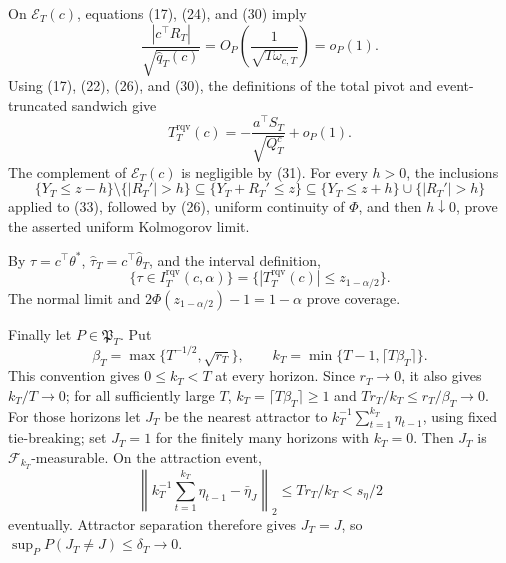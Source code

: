 On \(\mathcal E_T(c)\), equations (17), (24), and (30) imply
\[
 \frac{|c^\top R_T|}{\sqrt{\widehat q_T(c)}}
 =O_P\!\left(\frac1{\sqrt{T\omega_{c,T}}}\right)=o_P(1).
\tag{32}
\]
Using (17), (22), (26), and (30), the definitions of the total pivot and event-truncated sandwich give
\[
 T_T^{\mathrm{rqv}}(c)
 =-\frac{a^\top S_T}{\sqrt{Q_T^c}}+o_P(1).
\tag{33}
\]
The complement of \(\mathcal E_T(c)\) is negligible by (31). For every \(h>0\), the inclusions
\[
 \{Y_T\le z-h\}\setminus\{|R_T'|>h\}
 \subseteq\{Y_T+R_T'\le z\}
 \subseteq\{Y_T\le z+h\}\cup\{|R_T'|>h\}
\tag{34}
\]
applied to (33), followed by (26), uniform continuity of \(\Phi\), and then \(h\downarrow0\), prove the asserted uniform Kolmogorov limit.

By \(\tau=c^\top\theta^*\), \(\widehat\tau_T=c^\top\widehat\theta_T\), and the interval definition,
\[
 \{\tau\in I_T^{\mathrm{rqv}}(c,\alpha)\}
 =\{|T_T^{\mathrm{rqv}}(c)|\le z_{1-\alpha/2}\}.
\tag{35}
\]
The normal limit and \(2\Phi(z_{1-\alpha/2})-1=1-\alpha\) prove coverage.

Finally let \(P\in\mathfrak P_T\). Put
\[
 \beta_T=\max\{T^{-1/2},\sqrt{r_T}\},\qquad
 k_T=\min\{T-1,\lceil T\beta_T\rceil\}.
\tag{36}
\]
This convention gives \(0\le k_T<T\) at every horizon. Since \(r_T\to0\), it also gives \(k_T/T\to0\); for all sufficiently large \(T\), \(k_T=\lceil T\beta_T\rceil\ge1\) and \(Tr_T/k_T\le r_T/\beta_T\to0\). For those horizons let \(J_T\) be the nearest attractor to \(k_T^{-1}\sum_{t=1}^{k_T}\eta_{t-1}\), using fixed tie-breaking; set \(J_T=1\) for the finitely many horizons with \(k_T=0\). Then \(J_T\) is \(\mathcal F_{k_T}\)-measurable. On the attraction event,
\[
 \left\|k_T^{-1}\sum_{t=1}^{k_T}\eta_{t-1}-\bar\eta_J\right\|_2
 \le Tr_T/k_T<s_\eta/2
\tag{37}
\]
eventually. Attractor separation therefore gives \(J_T=J\), so \(\sup_PP(J_T\ne J)\le\delta_T\to0\).

